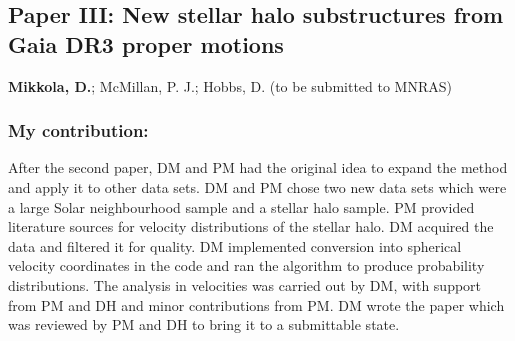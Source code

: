\subsection*{Paper III: New stellar halo substructures from Gaia DR3 proper motions}
\textbf{Mikkola, D.}; McMillan, P. J.; Hobbs, D. (to be submitted to MNRAS) \newline

\subsubsection*{My contribution:}
After the second paper, DM and PM had the original idea to expand the method and apply it to other data sets. DM and PM chose two new data sets which were a large Solar neighbourhood sample and a stellar halo sample. PM provided literature sources for velocity distributions of the stellar halo. DM acquired the data and filtered it for quality. DM implemented conversion into spherical velocity coordinates in the code and ran the algorithm to produce probability distributions. The analysis in velocities was carried out by DM, with support from PM and DH and minor contributions from PM. DM wrote the paper which was reviewed by PM and DH to bring it to a submittable state.